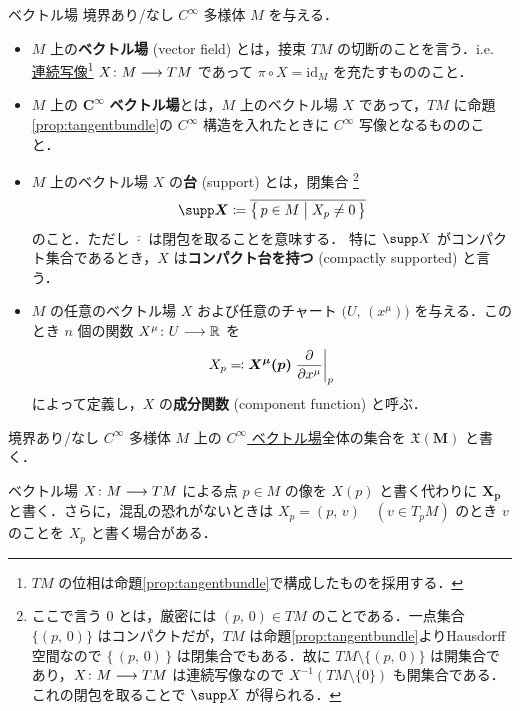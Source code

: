\documentclass[geometry_main]{subfiles}
\begin{document}
\begin{mydef}[label=def:vecf, breakable]{ベクトル場}
    境界あり/なし $C^\infty$ 多様体 $M$ を与える．
    \begin{itemize}
        \item $M$ 上の\textbf{ベクトル場} (vector field) とは，接束 $TM$ の切断のことを言う．i.e. \underline{連続写像}\footnote{$TM$ の位相は命題\ref{prop:tangentbundle}で構成したものを採用する．} $X \colon M \longrightarrow TM$ であって $\pi \circ X = \mathrm{id}_M$ を充たすもののこと．
        \item $M$ 上の $\bm{C^\infty}$ \textbf{ベクトル場}とは，$M$ 上のベクトル場 $X$ であって，$TM$ に命題\ref{prop:tangentbundle}の $C^\infty$ 構造を入れたときに $C^\infty$ 写像となるもののこと．
        \item $M$ 上のベクトル場 $X$ の\textbf{台} (support) とは，閉集合
        \footnote{ここで言う $0$ とは，厳密には $(p,\, 0) \in TM$ のことである．一点集合 $\{(p,\, 0) \}$ はコンパクトだが，$T M$ は命題\ref{prop:tangentbundle}よりHausdorff空間なので $\{\, (p,\, 0)\, \}$ は閉集合でもある．故に $T M \setminus \{(p,\, 0) \}$ は開集合であり，$X \colon M \longrightarrow TM$ は連続写像なので $X^{-1}(TM \setminus \{0\})$ も開集合である．これの閉包を取ることで $\supp X$ が得られる．}
        \begin{align}
            \bm{\supp X} \coloneqq \overline{\bigl\{\, p \in M \bigm| X_p \neq 0 \,\bigr\} }
        \end{align}
        のこと．ただし $\overline{\cdot}$ は閉包を取ることを意味する．
        特に $\supp X$ がコンパクト集合であるとき，$X$ は\textbf{コンパクト台を持つ} (compactly supported) と言う．
        \item $M$ の任意のベクトル場 $X$ および任意のチャート $\bigl(U,\, (x^\mu)\bigr)$ を与える．このとき $n$ 個の関数 $X^\mu \colon U \longrightarrow \mathbb{R}$ を
        \begin{align}
            X_p \eqqcolon \bm{X^\mu (p)} \eval{\pdv{}{x^\mu}}_p
        \end{align}
        によって定義し，$X$ の\textbf{成分関数} (component function) と呼ぶ．
    \end{itemize}
    \tcblower
    境界あり/なし $C^\infty$ 多様体 $M$ 上の \underline{$C^\infty$ ベクトル場}全体の集合を $\bm{\mathfrak{X}(M)}$ と書く．
\end{mydef}

\begin{marker}
    ベクトル場 $X \colon M \longrightarrow TM$ による点 $ p\in M$ の像を $X(p)$ と書く代わりに $\bm{X_p}$ と書く．さらに，混乱の恐れがないときは $X_p = (p,\, v)\quad (v \in T_p M)$ のとき $v$ のことを $X_p$ と書く場合がある．
\end{marker}
\end{document}
